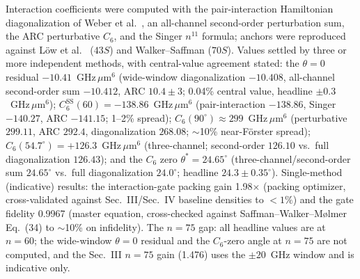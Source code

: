 \documentclass[twocolumn]{article}
\newcommand{\gum}[1]{GHz\,$\mu$m$^{#1}$}%
\begin{document}
Interaction coefficients were computed with the pair-interaction Hamiltonian diagonalization of Weber et al.\ \cite{Weber2017}, an all-channel second-order perturbation sum, the ARC perturbative $C_6$, and the Singer $n^{11}$ formula; anchors were reproduced against L\"ow et al.\ \cite{Low2012} ($43S$) and Walker--Saffman \cite{Walker2008} ($70S$). Values settled by three or more independent methods, with central-value agreement stated: the $\theta=0$ residual $-10.41$~\gum{6} (wide-window diagonalization $-10.408$, all-channel second-order sum $-10.412$, ARC $10.4\pm3$; 0.04\% central value, headline $\pm0.3$~\gum{6}); $C_6^{\text{SS}}(60)=-138.86$~\gum{6} (pair-interaction $-138.86$, Singer $-140.27$, ARC $-141.15$; 1--2\% spread); $C_6(90^\circ)\approx299$~\gum{6} (perturbative $299.11$, ARC $292.4$, diagonalization $268.08$; $\sim$10\% near-F\"orster spread); $C_6(54.7^\circ)=+126.3$~\gum{6} (three-channel; second-order $126.10$ vs.\ full diagonalization $126.43$); and the $C_6$ zero $\theta^*=24.65^\circ$ (three-channel/second-order sum $24.65^\circ$ vs.\ full diagonalization $24.0^\circ$; headline $24.3\pm0.35^\circ$). Single-method (indicative) results: the interaction-gate packing gain 1.98$\times$ (packing optimizer, cross-validated against Sec.~III/Sec.~IV baseline densities to $<1\%$) and the gate fidelity 0.9967 (master equation, cross-checked against Saffman--Walker--M\o lmer Eq.~(34) \cite{Saffman2010} to $\sim$10\% on infidelity). The $n=75$ gap: all headline values are at $n=60$; the wide-window $\theta=0$ residual and the $C_6$-zero angle at $n=75$ are not computed, and the Sec.~III $n=75$ gain (1.476) uses the $\pm20$~GHz window and is indicative only.



\end{document}
